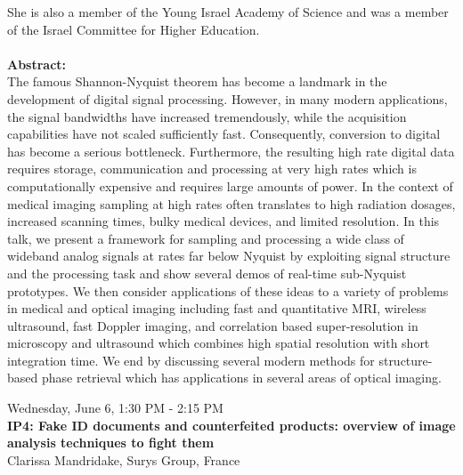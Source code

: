 She is also a member of the Young Israel Academy of Science and was a member of the Israel Committee for Higher Education.\\\\
\textbf{Abstract:}\\
The famous Shannon-Nyquist theorem has become a landmark in the development of digital signal processing. However, in many modern applications, the signal bandwidths have increased tremendously, while the acquisition capabilities have not scaled sufficiently fast. Consequently, conversion to digital has become a serious bottleneck. Furthermore, the resulting high rate digital data requires storage, communication and processing at very high rates which is computationally expensive and requires large amounts of power. In the context of medical imaging sampling at high rates often translates to high radiation dosages, increased scanning times, bulky medical devices, and limited resolution. In this talk, we present a framework for sampling and processing a wide class of wideband analog signals at rates far below Nyquist by exploiting signal structure and the processing task and show several demos of real-time sub-Nyquist prototypes. We then consider applications of these ideas to a variety of problems in medical and optical imaging including fast and quantitative MRI, wireless ultrasound, fast Doppler imaging, and correlation based super-resolution in microscopy and ultrasound which combines high spatial resolution with short integration time. We end by discussing several modern methods for structure-based phase retrieval which has applications in several areas of optical imaging.

\newpage\vspace{2cm}
\begin{center}{\Large{
Wednesday, June 6, 1:30 PM - 2:15 PM \\
\textbf{IP4: Fake ID documents and counterfeited products: overview of image analysis techniques to fight them}\\
Clarissa Mandridake, Surys Group, France}}
\end{center}
\vspace{1cm}

